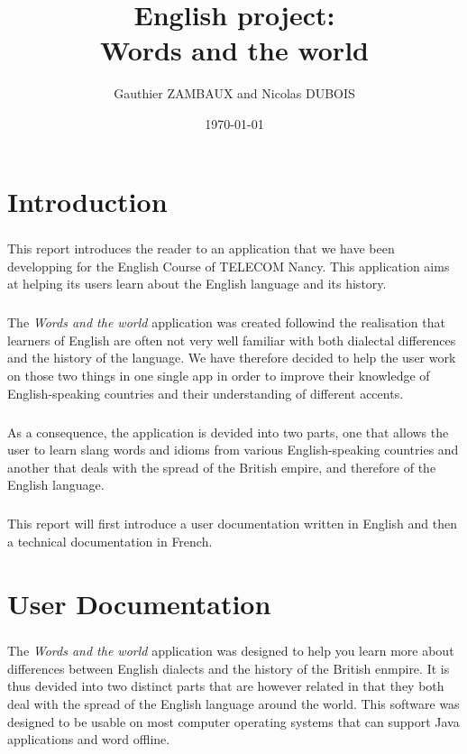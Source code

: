 \documentclass[11pt, a4paper]{report}
\title{English project:\\Words and the world}
\author{Gauthier ZAMBAUX and Nicolas DUBOIS}
\date{\today}
\begin{document}
\maketitle


\chapter*{Introduction}
\paragraph{}This report introduces the reader to an application that we have been developping for the English Course of TELECOM Nancy. This application aims at helping its users learn about the English language and its history.

\paragraph{}The \textit{Words and the world} application was created followind the realisation that learners of English are often not very well familiar with both dialectal differences and the history of the language. We have therefore decided to help the user work on those two things in one single app in order to improve their knowledge of English-speaking countries and their understanding of different accents.

\paragraph{}As a consequence, the application is devided into two parts, one that allows the user to learn slang words and idioms from various English-speaking countries and another that deals with the spread of the British empire, and therefore of the English language.

\paragraph{}This report will first introduce a user documentation written in English and then a technical documentation in French.


\chapter*{User Documentation}
\paragraph{}The \textit{Words and the world} application was designed to help you learn more about differences between English dialects and the history of the British enmpire. It is thus devided into two distinct parts that are however related in that they both deal with the spread of the English language around the world. This software was designed to be usable on most computer operating systems that can support Java applications and word offline.
\end{document}
